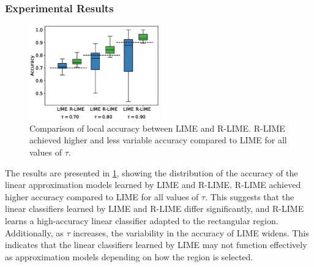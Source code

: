 \documentclass[11pt]{article}
\begin{document}
\subsubsection{Experimental Results}
\begin{figure}[tbp]
  \centering
  \includegraphics[width=0.5\textwidth]{experiments/exp2/box_plot}
  \caption[Comparison of Local Accuracy between R-LIME and LIME]{%
    Comparison of local accuracy between LIME and R-LIME\@.
    R-LIME achieved higher and less variable accuracy compared to LIME
    for all values of $\tau$.
  }\label{fig:box_plot}
\end{figure}
The results are presented in \cref{fig:box_plot},
showing the distribution of the accuracy of the linear approximation models
learned by LIME and R-LIME\@.
R-LIME achieved higher accuracy compared to LIME for all values of $\tau$.
This suggests that the linear classifiers learned by LIME and R-LIME
differ significantly,
and R-LIME learns a high-accuracy linear classifier adapted to the rectangular region.
Additionally, as $\tau$ increases,
the variability in the accuracy of LIME widens.
This indicates that the linear classifiers learned by LIME may not function
effectively as approximation models depending on how the region is selected.
\end{document}
